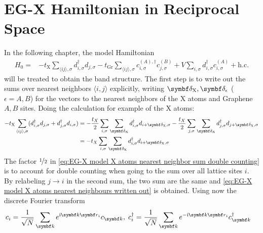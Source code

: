 \documentclass[../main.tex]{subfiles}
\begin{document}
\chapter{EG-X Hamiltonian in Reciprocal Space}\label{ch:EG-X Hamiltonian in Reciprocal Space}

In the following chapter, the model Hamiltonian
\begin{align}
	H_0 = &-t_{\mathrm{X}} \sum_{\langle ij \rangle, \sigma} d_{i, \sigma}^{\dagger} d_{j, \sigma}
	-t_{\mathrm{Gr}} \sum_{\langle ij \rangle, \sigma}
	c_{i, \sigma}^{(A), \dagger} c_{j, \sigma}^{(B)}
	+ V \sum_{i, \sigma} d_{i, \sigma}^{\dagger} c_{i, \sigma}^{(A)} + \mathrm{h.c.} \label{eq:EG-X model Hamiltonian non-interacting appendix}
\end{align}
will be treated to obtain the band structure. The first step is to write out the sums over nearest neighbors \(\langle i, j \rangle\) explicitly, writing \(\vb{\delta}_{\mathrm{X}}, \vb{\delta}_{\epsilon}\) (\(\epsilon = A, B\)) for the vectors to the nearest neighbors of the \(\mathrm{X}\) atoms and Graphene \(A, B\) sites.
Doing the calculation for example of the \(\mathrm{X}\) atoms:
\begin{align}
	-t_{\mathrm{X}} \sum_{\langle ij \rangle, \sigma} (d_{i, \sigma}^{\dagger} d_{j, \sigma} + d_{j, \sigma}^{\dagger} d_{i, \sigma})
	&= -\frac{t_X}{2} \sum_{i,\sigma} \sum_{\vb{\delta}_{\mathrm{X}}} d_{i, \sigma}^{\dagger} d_{i + \vb{\delta}_{\mathrm{X}}, \sigma}
	-\frac{t_X}{2} \sum_{j,\sigma} \sum_{\vb{\delta}_{\mathrm{X}}} d_{j, \sigma}^{\dagger} d_{j + \vb{\delta}_{\mathrm{X}}, \sigma} \label{eq:EG-X model X atoms nearest neighbor sum double counting} \\
	&= -t_X \sum_{i,\sigma} \sum_{\vb{\delta}_{\mathrm{X}}} d_{i, \sigma}^{\dagger} d_{i + \vb{\delta}_{\mathrm{X}}, \sigma} \label{eq:EG-X model X atoms nearest neighbours written out}
\end{align}
The factor \(\nicefrac{1}{2}\) in \cref{eq:EG-X model X atoms nearest neighbor sum double counting} is to account for double counting when going to the sum over all lattice sites \(i\).
By relabeling \(j \to i\) in the second sum, the two sum are the same and \cref{eq:EG-X model X atoms nearest neighbours written out} is obtained.
Using now the discrete Fourier transform
\begin{align}
	c_{i} &= \frac{1}{\sqrt{N}} \sum_{\vb{k}} e^{\iu \vb{k} \vb{r}_{i}} c_{\vb{k}} ,\;
	c_{i}^{\dagger} = \frac{1}{\sqrt{N}} \sum_{\vb{k}} e^{-\iu \vb{k} \vb{r}_{i}} c_{\vb{k}}^{\dagger}
\end{align}
\end{document}
